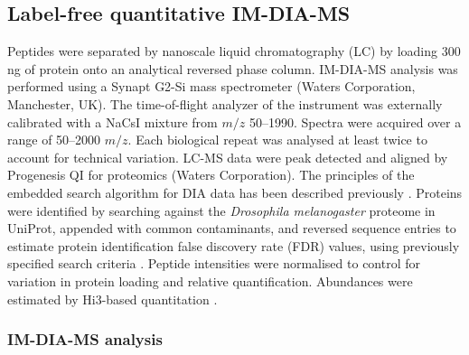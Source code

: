 \subsection{Label-free quantitative IM-DIA-MS}

Peptides were separated by nanoscale liquid chromatography (LC) by loading $300$ ng of protein onto an analytical reversed phase column.
IM-DIA-MS analysis was performed using a Synapt G2-Si mass spectrometer (Waters Corporation, Manchester, UK).
The time-of-flight analyzer of the instrument was externally calibrated with a NaCsI mixture from $m/z$ \numrange{50}{1990}.
Spectra were acquired over a range of \numrange{50}{2000} $m/z$. Each biological repeat was analysed at least twice to account for technical variation.
LC-MS data were peak detected and aligned by Progenesis QI for proteomics (Waters Corporation).
The principles of the embedded search algorithm for DIA data has been described previously \cite{Li2009}.
Proteins were identified by searching against the \textit{Drosophila melanogaster} proteome in UniProt, appended with common contaminants, and reversed sequence entries to estimate protein identification false discovery rate (FDR) values, using previously specified search criteria \cite{Distler2014}.
Peptide intensities were normalised to control for variation in protein loading and relative quantification.
Abundances were estimated by Hi3-based quantitation \cite{Silva2006}.

\subsubsection{IM-DIA-MS analysis}

